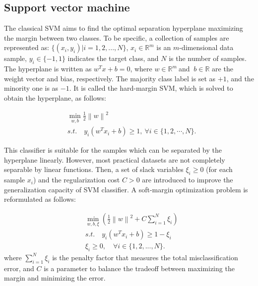 \subsection{Support vector machine}
\label{SVM}

The classical SVM aims to find the optimal separation hyperplane maximizing the margin between two classes. To be specific, a collection of samples are represented as: $\{(x_i,y_i)| i = 1,2,...,N\}$, $ x_i \in \mathbb{R}^m $ is an $ m $-dimensional data sample, $ y_i \in \{-1,1\}$ indicates the target class, and $ N $ is the number of samples. The hyperplane is written as $w^Tx + b = 0 $, where $w\in \mathbb{R}^m \ $and $\ b\in \mathbb{R}$ are the weight vector and bias, respectively. The majority class label is set as $ +1 $, and the minority one is as $ -1 $. It is called the hard-margin SVM, which is solved to obtain the hyperplane, as follows:

\begin{equation}\label{TraditionalSVM}
	\begin{split}
		&\mathop{\min}\limits_{w,b}\frac{1}{2}{\left \|w \right \|}^{2}\\
		& s.t. \quad y_i(w^Tx_i+b)\ge 1, \ \forall i\in \{1,2,\cdots,N\}.
	\end{split}
\end{equation}

This classifier is suitable for the samples which can be separated by the hyperplane linearly. However, most practical datasets are not completely separable by linear functions. Then, a set of slack variables $\xi_i\ge 0$ (for each sample $x_i$) and the regularization cost $C>0$ are introduced to improve the generalization capacity of SVM classifier. A soft-margin optimization problem is reformulated as follows:

\begin{equation}
	\begin{split}
		& \mathop{\min}\limits_{w,b,\xi}(\frac{1}{2}{\left \|w \right \|}^{2}+C\sum\limits_{i=1}^N\xi_i)\\
		& s.t. \quad y_i(w^Tx_i+b)\ge 1-\xi_i\\
		&\xi_i \ge 0,\quad\forall i\in \{1,2,...,N\}.
	\end{split}
\end{equation}
where $\sum\limits_{i=1}^N\xi_i$ is the penalty factor that measures the total misclassification error, and $C$ is a parameter to balance the tradeoff between maximizing the margin and minimizing the error.

